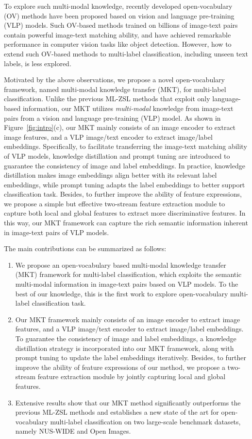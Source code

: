 \documentclass[letterpaper]{article} %
\begin{document}
To explore such multi-modal knowledge, recently developed open-vocabulary (OV) methods \cite{openvild, opensedo, openseg, openprompt, liang2022mind} have been proposed  based on vision and language pre-training (VLP) models.
Such OV-based methods trained on billions of image-text pairs contain powerful image-text matching ability, and have achieved remarkable performance in computer vision tasks like object detection.
However,  how to extend such OV-based methods  to multi-label classification, including unseen text labels, is less explored.
\par
Motivated by the above observations, 
we propose a novel open-vocabulary framework, named multi-modal knowledge transfer (MKT), for multi-label classification.
Unlike the previous ML-ZSL methods that exploit only language-based information, our MKT utilizes \textit{multi-modal} knowledge from image-text pairs from a  vision and language pre-training (VLP) model.
As shown in Figure~\ref{fig:intro}(c), our MKT mainly consists of an image encoder to extract image features,  and a VLP image/text encoder
to extract image/label embeddings.
Specifically,  
to facilitate transferring the image-text matching ability of VLP models, 
knowledge distillation and prompt tuning are introduced to guarantee the consistency of image and label embeddings.
In practice, knowledge distillation  makes image embeddings align better with its relevant label embeddings, while prompt tuning adapts the label embeddings to better support classification task.
Besides, to further improve the ability of feature  expressions,
we propose a simple but effective two-stream feature extraction module to capture both local and global features to extract more discriminative features.
In this way, our MKT framework can capture the rich semantic information inherent in image-text pairs of VLP models.
\par
The main contributions can be summarized as follows:
\begin{enumerate}
    \item We propose an open-vocabulary based multi-modal knowledge transfer (MKT) framework for multi-label classification, which exploits the semantic multi-modal information in image-text pairs based on VLP models.
    To the best of our knowledge, this is the first work to explore open-vocabulary multi-label classification task.
    \item Our MKT framework mainly consists of an image encoder to extract image features, and a VLP image/text encoder to extract image/label embeddings.
    To guarantee the consistency of image and label embeddings, a knowledge distillation strategy is incorporated into our MKT framework, along with prompt tuning to update the label embeddings iteratively.   Besides, to further improve the ability of feature expressions of our method, 
    we propose a two-stream feature extraction module by  jointly capturing local and global features. 
    \item Extensive results show that our MKT method significantly outperforms the previous ML-ZSL methods and establishes a new state of the art for open-vocabulary multi-label classification on two large-scale benchmark datasets, namely NUS-WIDE and Open Images.
\end{enumerate}
\end{document}
